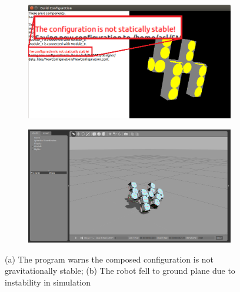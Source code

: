 \documentclass[conference]{IEEEtran}
\theoremstyle{definition}
\begin{document}
\begin{figure}
\begin{center}
        \begin{subfigure}[b]{0.48\columnwidth}
                \includegraphics[width=\textwidth]{images/designer_unstable.png}
                \caption{}
                \label{fig:designer_unstable}
           \end{subfigure}
        \begin{subfigure}[b]{0.48\columnwidth}
                \includegraphics[width=\textwidth]{images/gazebo_unstable2.png}
                \caption{}
                \label{fig:gazebo_unstable2}
        \end{subfigure}
\end{center}
\caption{(a) The program warns the composed configuration is not gravitationally stable; (b) The robot fell to ground plane due to instability in simulation}
\label{fig:unstable}
\end{figure}
\end{document}
